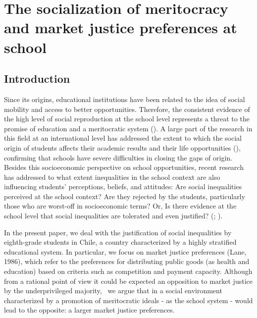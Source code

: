 \documentclass[
  letterpaper,
  DIV=11,
  numbers=noendperiod]{scrartcl}
\author{}
\date{}
\begin{document}
\section{The socialization of meritocracy and market justice preferences
at
school}\label{the-socialization-of-meritocracy-and-market-justice-preferences-at-school}

\subsection{Introduction}\label{introduction}

Since its origins, educational institutions have been related to the
idea of social mobility and access to better opportunities. Therefore,
the consistent evidence of the high level of social reproduction at the
school level represents a threat to the promise of education and a
meritocratic system (). A large part of the research in this field at an
international level has addressed the extent to which the social origin
of students affects their academic results and their life opportunities
(),
confirming that schools have severe difficulties in closing the gaps of
origin. Besides this socioeconomic perspective on school opportunities,
recent research has addressed to what extent inequalities in the school
context are also influencing students' perceptions, beliefs, and
attitudes: Are social inequalities perceived at the school context? Are
they rejected by the students, particularly those who are worst-off in
socioeconomic terms? Or, Is there evidence at the school level that
social inequalities are tolerated and even justified?
(;
).~

In the present paper, we deal with the justification of social
inequalities by eighth-grade students in Chile, a country characterized
by a highly stratified educational system. In particular, we focus on
market justice preferences (Lane, 1986), which refer to the preferences
for distributing public goods (as health and education) based on
criteria such as competition and payment capacity. Although from a
rational point of view it could be expected an opposition to market
justice by the underprivileged majority,~ we argue that in a social
environment characterized by a promotion of meritocratic ideals - as the
school system - would lead to the opposite: a larger market justice
preferences.~
\end{document}
